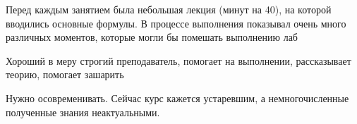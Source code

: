             \begin{commentbox} 
                Перед каждым занятием была небольшая лекция (минут на 40), на которой вводились основные формулы. В процессе выполнения показывал очень много различных моментов, которые могли бы помешать выполнению лаб 
            \end{commentbox} 
        
            \begin{commentbox} 
                Хороший в меру строгий преподаватель, помогает на выполнении, рассказывает теорию, помогает зашарить 
            \end{commentbox} 
        
            \begin{commentbox} 
                Нужно осовременивать. Сейчас курс кажется устаревшим, а немногочисленные полученные знания неактуальными.  
            \end{commentbox}


